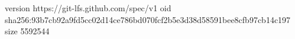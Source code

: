 version https://git-lfs.github.com/spec/v1
oid sha256:93b7cb92a9fd5cc02d14ce786bd070fcf2b5e3d38d58591bee8cfb97cb14c197
size 5592544
